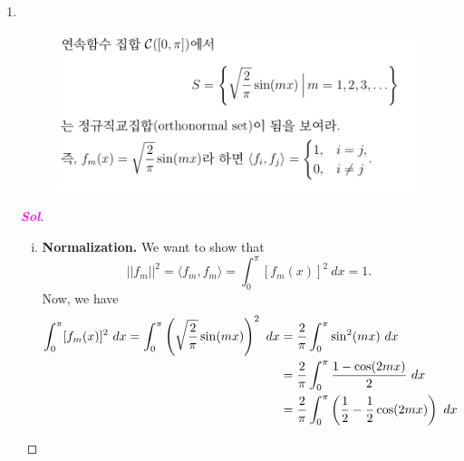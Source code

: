 \documentclass[10pt]{article}
\theoremstyle{definition}
\newcommand{\sol}{\textcolor{magenta}{\bf Sol}}
\newcommand{\inner}[1]{\langle #1\rangle}
\newcommand{\norms}[1]{|| #1||}
\begin{document}
\begin{enumerate}[\bf 1.]
\begin{proof}[\sol]
\begin{enumerate}[(a)]
\begin{align*}
		&\iff t^2\int_a^b[f(x)]^2\ dx-2t\int_a^bf(x)g(x)\ dx+\int_a^b[g(x)]^2\ dx\geq 0\\
		&\iff At^2+Bt+C\geq0\quad\text{with}\quad\begin{cases}
			A=\int_a^b[f(x)]^2\ dx,\\
			B=-2\int_a^bf(x)g(x)\ dx,\\
			C=\int_a^b[g(x)]^2\ dx.
		\end{cases}
	\end{align*}
	\item \begin{align*}
		&B^2-4AC=\del{-2\int_a^bf(x)g(x)\ dx}^2-4\del{\int_a^b[f(x)]^2\ dx}\del{\int_a^b[g(x)]^2\ dx}\leq 0\\
		\implies&
		4\del{\int_a^bf(x)g(x)}\leq 4\del{\int_a^b[f(x)]^2\ dx}\del{\int_a^b[g(x)]^2\ dx}\\
		\implies&\left(\int_a^bf(x)g(x)\ dx\right)^2\leq\left(\int_a^b[f(x)]^2\ dx\right)\left(\int_a^b[g(x)]^2\ dx\right).
	\end{align*}
\end{enumerate}
\end{proof}
\newpage
\item \ \begin{figure}[h!]
	\includegraphics[scale=.35]{asgmt1_9.png}
\end{figure}
\begin{proof}[\sol]
\begin{enumerate}[(i)]
	\item \textbf{Normalization.} We want to show that \[
	\norms{f_m}^2=\inner{f_m,f_m}=\int_0^\pi [f_m(x)]^2\ dx=1.
	\] Now, we have \begin{align*}
		\int_0^\pi [f_m(x)]^2\ dx=\int_0^\pi\del{\sqrt{\frac{2}{\pi}}\sin(mx)}^2\ dx&=\frac{2}{\pi}\int_0^\pi\sin^2(mx)\ dx\\
		&=\frac{2}{\pi}\int_0^\pi\frac{1-\cos(2mx)}{2}\ dx\\
		&=\frac{2}{\pi}\int_0^\pi\del{\frac{1}{2}-\frac{1}{2}\cos(2mx)}\ dx\\

\end{align*}
\end{enumerate}
\end{proof}
\end{enumerate}
\end{document}
